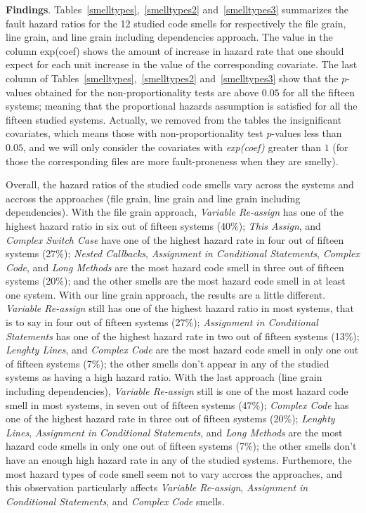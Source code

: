 \textbf{Findings}. {\color{blue}Tables~\ref{smelltypes},~\ref{smelltypes2} and~\ref{smelltypes3} summarizes the fault hazard ratios for the 12 studied code smells for respectively the file grain, line grain, and line grain including dependencies approach}. The value in the column exp(coef) shows the amount of increase in hazard rate that one should expect for each unit increase in the value of the corresponding covariate. %
The last column of {\color{blue}Tables~\ref{smelltypes},~\ref{smelltypes2} and~\ref{smelltypes3}} show that the $p$-values obtained for the non-proportionality tests are above $0.05$ for all the {\color{blue}fifteen} systems; meaning that the proportional hazards assumption is satisfied for all the {\color{blue}fifteen} studied systems. {\color{blue}Actually, we removed from the tables the insignificant covariates, which means those with non-proportionality test $p$-values less than $0.05$, and we will only consider the covariates with \textsl{exp(coef)} greater than $1$ (for those the corresponding files are more fault-proneness when they are smelly).}

Overall, the hazard ratios of the studied code smells vary across the systems {\color{blue} and accross the approaches (file grain, line grain and line grain including dependencies). With the file grain approach, \textsl{Variable Re-assign} has one of the highest hazard ratio in six out of fifteen systems (40\%); \textsl{This Assign}, and \textsl{Complex Switch Case} have one of the highest hazard rate in four out of fifteen systems (27\%); \textsl{Nested Callbacks}, \textsl{Assignment in Conditional Statements}, \textsl{Complex Code}, and \textsl{Long Methods} are the most hazard code smell in three out of fifteen systems (20\%); and the other smells are the most hazard code smell in at least one system. With our line grain approach, the results are a little different. \textsl{Variable Re-assign} still has one of the highest hazard ratio in most systems, that is to say in four out of fifteen systems (27\%); \textsl{Assignment in Conditional Statements}  has one of the highest hazard rate in two out of fifteen systems (13\%); \textsl{Lenghty Lines}, and \textsl{Complex Code} are the most hazard code smell in only one out of fifteen systems (7\%); the other smells don't appear in any of the studied systems as having a high hazard ratio. With the last approach (line grain including dependencies), \textsl{Variable Re-assign} still is one of the most hazard code smell in most systems, in seven out of fifteen systems (47\%); \textsl{Complex Code}  has one of the highest hazard rate in three out of fifteen systems (20\%); \textsl{Lenghty Lines}, \textsl{Assignment in Conditional Statements}, and \textsl{Long Methods} are the most hazard code smells in only one out of fifteen systems (7\%); the other smells don't have an enough high hazard rate in any of the studied systems. Furthemore, the most hazard types of code smell seem not to vary accross the approaches, and this observation particularly affects \textsl{Variable Re-assign}, \textsl{Assignment in Conditional Statements}, and \textsl{Complex Code} smells.}


